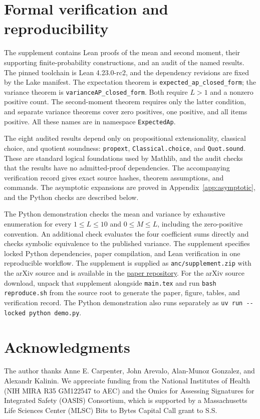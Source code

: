 \documentclass[10pt]{article}
\begin{document}
\newpage
\section{Formal verification and reproducibility}
The supplement contains Lean proofs of the mean and second moment, their supporting finite-probability constructions, and an audit of the named results.
The pinned toolchain is Lean 4.23.0-rc2, and the dependency revisions are fixed by the Lake manifest.
The expectation theorem is \texttt{expected\_ap\_closed\_form}; the variance theorem is \texttt{varianceAP\_closed\_form}.
Both require $L>1$ and a nonzero positive count.
The second-moment theorem requires only the latter condition, and separate variance theorems cover zero positives, one positive, and all items positive.
All these names are in namespace \texttt{ExpectedAp}.

The eight audited results depend only on propositional extensionality, classical choice, and quotient soundness: \texttt{propext}, \texttt{Classical.choice}, and \texttt{Quot.sound}.
These are standard logical foundations used by Mathlib, and the audit checks that the results have no admitted-proof dependencies.
The accompanying verification record gives exact source hashes, theorem assumptions, and commands.
The asymptotic expansions are proved in Appendix~\ref{app:asymptotic}, and the Python checks are described below.

The Python demonstration checks the mean and variance by exhaustive enumeration for every $1\le L\le10$ and $0\le M\le L$, including the zero-positive convention.
An additional check evaluates the four coefficient sums directly and checks symbolic equivalence to the published variance.
The supplement specifies locked Python dependencies, paper compilation, and Lean verification in one reproducible workflow.
The supplement is supplied as \texttt{anc/supplement.zip} with the arXiv source and is available in the \href{https://github.com/shntnu/expected_ap}{paper repository}.
For the arXiv source download, unpack that supplement alongside \texttt{main.tex} and run \texttt{bash reproduce.sh} from the source root to generate the paper, figure, tables, and verification record.
The Python demonstration also runs separately as \texttt{uv run -{}-locked python demo.py}.

\section*{Acknowledgments}
The author thanks Anne E. Carpenter, John Arevalo, Alan-Munoz Gonzalez, and Alexandr Kalinin.
We appreciate funding from the National Institutes of Health (NIH MIRA R35 GM122547 to AEC) and the Omics for Assessing Signatures for Integrated Safety (OASIS) Consortium, which is supported by a Massachusetts Life Sciences Center (MLSC) Bits to Bytes Capital Call grant to S.S.
\end{document}
